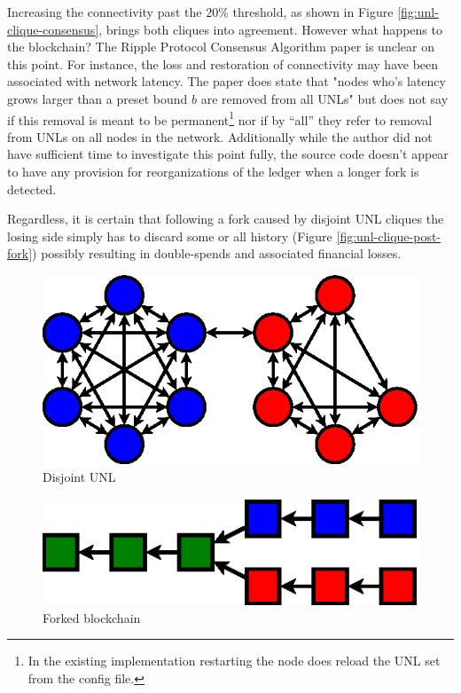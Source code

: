 \documentclass{article}
\begin{document}
Increasing the connectivity past the $20\%$ threshold, as shown in Figure
\ref{fig:unl-clique-consensus}, brings both cliques into agreement. However
what happens to the blockchain? The Ripple Protocol Consensus Algorithm paper
is unclear on this point. For instance, the loss and restoration of
connectivity may have been associated with network latency. The paper does
state that "nodes who’s latency grows larger than a preset bound $b$ are
removed from all UNLs"\cite[3.4.1]{ripple-consensus-paper} but does not say if
this removal is meant to be permanent\footnote{In the existing implementation
restarting the node does reload the UNL set from the config file.} nor if by
``all'' they refer to removal from UNLs on all nodes in the network.
Additionally while the author did not have sufficient time to investigate this
point fully, the source code doesn't appear to have any provision for
reorganizations of the ledger when a longer fork is detected.

Regardless, it is certain that following a fork caused by disjoint UNL cliques
the losing side simply has to discard some or all history (Figure
\ref{fig:unl-clique-post-fork}) possibly resulting in double-spends and
associated financial losses.

\begin{figure}
    \centering
    \includegraphics{figures/unl-clique-disjoint.eps}
    \caption{Disjoint UNL}
    \label{fig:unl-clique-disjoint}
\end{figure}

\begin{figure}
    \centering
    \includegraphics{figures/unl-clique-disjoint-blockchain.eps}
    \caption{Forked blockchain}
    \label{fig:unl-clique-disjoint-blockchain}
\end{figure}
\end{document}
